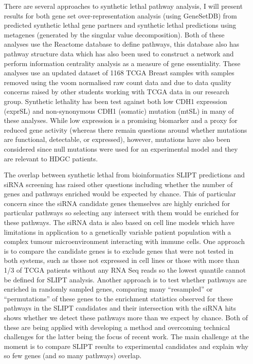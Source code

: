 There are several approaches to synthetic lethal pathway analysis, I will present results for both gene set over-representation analysis (using GeneSetDB) from predicted synthetic lethal gene partners and synthetic lethal predictions using metagenes (generated by the singular value decomposition). Both of these analyses use the Reactome database to define pathways, this database also has pathway structure data which has also been used to construct a network and perform information centrality analysis as a measure of gene essentiality. These analyses use an updated dataset of 1168 TCGA Breast samples with samples removed using the voom normalised raw count data and due to data quality concerns raised by other students working with TCGA data in our research group. Synthetic lethality has been test against both low CDH1 expression (exprSL) and non-synonymous CDH1 (somatic) mutation (mtSL) in many of these analyses. While low expression is a promising biomarker and a proxy for reduced gene activity (whereas there remain questions around whether mutations are functional, detectable, or expressed), however, mutations have also been considered since null mutations were used for an experimental model and they are relevant to HDGC patients.

The overlap between synthetic lethal from bioinformatics SLIPT predictions and siRNA screening has raised other questions including whether the number of genes and pathways enriched would be expected by chance. This of particular concern since the siRNA candidate genes themselves are highly enriched for particular pathways so selecting any intersect with them would be enriched for these pathways. The siRNA data is also based on cell line models which have limitations in application to a genetically variable patient population with a complex tumour microenvironment interacting with immune cells. One approach is to compare the candidate genes is to exclude genes that were not tested in both systems, such as those not expressed in cell lines or those with more than 1/3 of TCGA patients without any RNA Seq reads so the lowest quantile cannot be defined for SLIPT analysis. Another approach is to test whether pathways are enriched in randomly sampled genes, comparing many “resampled” or “permutations” of these genes to the enrichment statistics observed for these pathways in the SLIPT candidates and their intersection with the siRNA hits shows whether we detect these pathways more than we expect by chance.
Both of these are being applied with developing a method and overcoming technical challenges for the latter being the focus of recent work. The main challenge at the moment is to compare SLIPT results to experimental candidates and explain why so few genes (and so many pathways) overlap.

